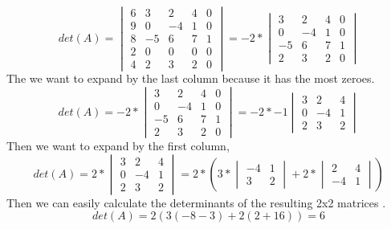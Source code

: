 \documentclass{amsart}
\begin{document}
\begin{equation*}
det(A) = 
\begin{vmatrix}
  6&3   &2  &4  &0\\
  9&0   &-4  &1  &0 \\
 8 & -5  &6  &7  &1 \\
  2  &0   &0  &0 &0 \\
  4&2&3&2&0   
\end{vmatrix}
 = 
 -2*
 \begin{vmatrix}
  3   &2  &4  &0\\
0   &-4  &1  &0 \\
 -5  &6  &7  &1 \\
2&3&2&0   
\end{vmatrix}
\end{equation*}
The we want to expand by the last column because it has the most zeroes.
\begin{equation*}
det(A)
 = 
 -2*
 \begin{vmatrix}
  3   &2  &4  &0\\
0   &-4  &1  &0 \\
 -5  &6  &7  &1 \\
2&3&2&0   
\end{vmatrix}
 = 
 -2*-1
  \begin{vmatrix}
  3   &2  &4  \\
0   &-4  &1   \\
2&3&2   
\end{vmatrix}
\end{equation*}
Then we want to expand by the first column,
\begin{equation*}
det(A) = 
 2*
  \begin{vmatrix}
  3   &2  &4  \\
0   &-4  &1   \\
2&3&2   
\end{vmatrix}
 = 
 2*
 (3 * 
   \begin{vmatrix}
-4  &1 \\
3&2   
\end{vmatrix}
+
2* 
 \begin{vmatrix}
 2  &4  \\
  -4  &1    
\end{vmatrix}
)
\end{equation*}
Then we can easily calculate the determinants of the resulting 2x2 matrices .
\begin{equation*}
det(A) = 2(3(-8-3)+2(2+16)) = 6 
\end{equation*}
\vspace{1in}
\end{document}
